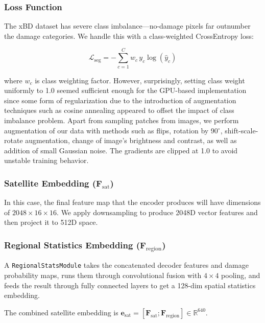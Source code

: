 \documentclass[journal]{IEEEtran}
\begin{document}
\subsubsection{Loss Function}

The xBD dataset has severe class imbalance---no-damage pixels far outnumber the damage categories. We handle this with a class-weighted CrossEntropy loss:

\begin{equation}
\mathcal{L}_\text{seg} = -\sum_{c=1}^{C} w_c \, y_c \log(\hat{y}_c)
\end{equation}

where $w_c$ is class weighting factor. However, surprisingly, setting class weight uniformly to 1.0 seemed sufficient enough for the GPU-based implementation since some form of regularization due to the introduction of augmentation techniques such as cosine annealing appeared to offset the impact of class imbalance problem. Apart from sampling patches from images, we perform augmentation of our data with methods such as flips, rotation by 90$^\circ$, shift-scale-rotate augmentation, change of image's brightness and contrast, as well as addition of small Gaussian noise. The gradients are clipped at 1.0 to avoid unstable training behavior.

\subsubsection{Satellite Embedding ($\mathbf{F}_\text{sat}$)}

In this case, the final feature map that the encoder produces will have dimensions of $2048 \times 16 \times 16$. We apply downsampling to produce 2048D vector features and then project it to 512D space.

\subsubsection{Regional Statistics Embedding ($\mathbf{F}_\text{region}$)}

A \texttt{RegionalStatsModule} takes the concatenated decoder features and damage probability maps, runs them through convolutional fusion with $4 \times 4$ pooling, and feeds the result through fully connected layers to get a 128-dim spatial statistics embedding.

The combined satellite embedding is $\mathbf{e}_\text{sat} = [\mathbf{F}_\text{sat}; \mathbf{F}_\text{region}] \in \mathbb{R}^{640}$.
\end{document}

